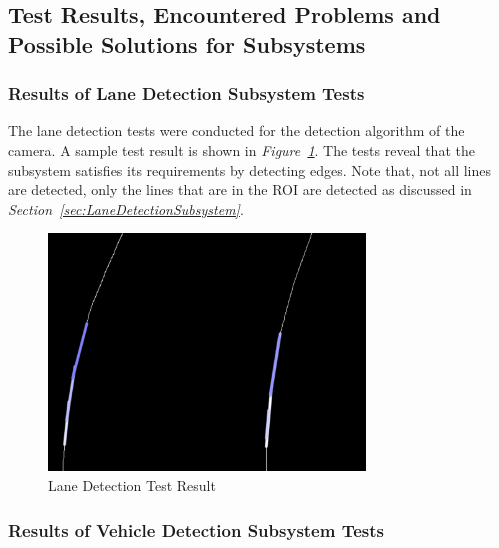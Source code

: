 \documentclass[a4paper,12pt]{article}
\begin{document}
	\subsection{Test Results, Encountered Problems and Possible Solutions for Subsystems}	
	
	\subsubsection*{Results of Lane Detection Subsystem Tests}
		
	The lane detection tests were conducted for the detection algorithm of the camera. A sample test result is shown in \textit{Figure~\ref{fig:laneD_test}}. The tests reveal that the subsystem satisfies its requirements by detecting edges. Note that, not all lines are detected, only the lines that are in the ROI are detected as discussed in \textit{Section~\ref{sec:LaneDetectionSubsystem}}.
	
				\begin{figure}[h]
		\includegraphics[width=0.75\textwidth,center]{images/laneD_test}
		\caption{Lane Detection Test Result \label{fig:laneD_test} }
	\end{figure}
		
	
	
	\subsubsection*{Results of Vehicle Detection Subsystem Tests}
	
\end{document}
